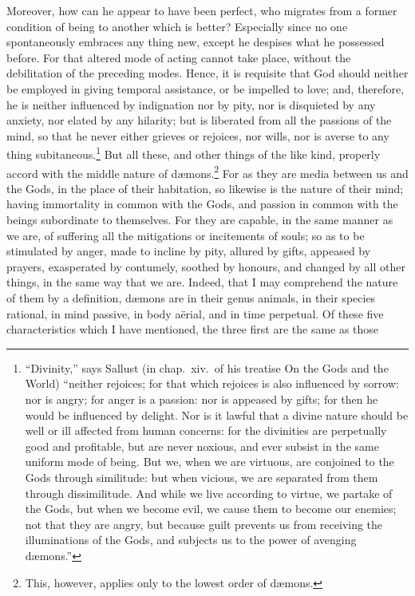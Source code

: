 \documentclass[12pt]{article}
\begin{document}
Moreover, how can he appear to have been perfect, who migrates from a former
condition of being to another which is better? Especially since no one
spontaneously embraces any thing new, except he despises what he possessed
before. For that altered mode of acting cannot take place, without the
debilitation of the preceding modes. Hence, it is requisite that God should
neither be employed in giving temporal assistance, or be impelled to love; and,
therefore, he is neither influenced by indignation nor by pity, nor is
disquieted by any anxiety, nor elated by any hilarity; but is liberated from
all the passions of the mind, so that he never either grieves or rejoices, nor
wills, nor is averse to any thing subitaneous.\footnote{``Divinity,'' says
Sallust (in chap.~xiv.~of his treatise On the Gods and the World)
``neither rejoices; for that which rejoices is also influenced by sorrow: nor
is angry; for anger is a passion: nor is appeased by gifts; for then he would
be influenced by delight. Nor is it lawful that a divine nature should be well
or ill affected from human concerns: for the divinities are perpetually good
and profitable, but are never noxious, and ever subsist in the same uniform
mode of being. But we, when we are virtuous, are conjoined to the Gods through
similitude: but when vicious, we are separated from them through dissimilitude.
And while we live according to virtue, we partake of the Gods, but when we
become evil, we cause them to become our enemies; not that they are angry, but
because guilt prevents us from receiving the illuminations of the Gods, and
subjects us to the power of avenging d{\ae}mons.''} But all these, and other
things of the like kind, properly accord with the middle nature of
d{\ae}mons.\footnote{This, however, applies only to the lowest order of
d{\ae}mons.} For as they are media between us and the Gods, in the place of
their habitation, so likewise is the nature of their mind; having immortality
in common with the Gods, and passion in common with the beings subordinate to
themselves.  For they are capable, in the same manner as we are, of suffering
all the mitigations or incitements of souls; so as to be stimulated by anger,
made to incline by pity, allured by gifts, appeased by prayers, exasperated by
contumely, soothed by honours, and changed by all other things, in the same way
that we are. Indeed, that I may comprehend the nature of them by a definition,
d{\ae}mons are in their genus animals, in their species rational, in mind
passive, in body a\"{e}rial, and in time perpetual. Of these five
characteristics which I have mentioned, the three first are the same as those
\end{document}
